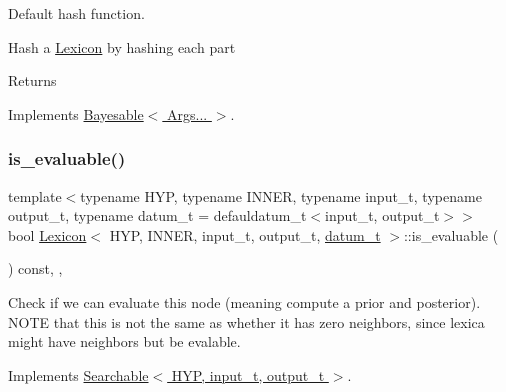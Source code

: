 Default hash function. 

Hash a \hyperlink{class_lexicon}{Lexicon} by hashing each part \begin{DoxyReturn}{Returns}

\end{DoxyReturn}


Implements \hyperlink{class_bayesable_a26f6d55e7526ebd897cbb27c757b611b}{Bayesable$<$ Args... $>$}.

\mbox{\label{class_lexicon_ab9fcefbd8598a5401a39bd59e8043db9}} 
\subsubsection{\texorpdfstring{is\+\_\+evaluable()}{is\_evaluable()}}
{\footnotesize\ttfamily template$<$typename H\+YP, typename I\+N\+N\+ER, typename input\+\_\+t, typename output\+\_\+t, typename datum\+\_\+t = defauldatum\+\_\+t$<$input\+\_\+t, output\+\_\+t$>$$>$ \\
bool \hyperlink{class_lexicon}{Lexicon}$<$ H\+YP, I\+N\+N\+ER, input\+\_\+t, output\+\_\+t, \hyperlink{class_bayesable_a9f1a6c0cd7855550fa10b1a8f13a5867}{datum\+\_\+t} $>$\+::is\+\_\+evaluable (\begin{DoxyParamCaption}{ }\end{DoxyParamCaption}) const\hspace{0.3cm}{\ttfamily [inline]}, {\ttfamily [override]}, {\ttfamily [virtual]}}



Check if we can evaluate this node (meaning compute a prior and posterior). N\+O\+TE that this is not the same as whether it has zero neighbors, since lexica might have neighbors but be evalable. 



Implements \hyperlink{class_searchable_a23786e95730117c3cc4b90e010494a1e}{Searchable$<$ H\+Y\+P, input\+\_\+t, output\+\_\+t $>$}.

\mbox{\label{class_lexicon_ad237c78e3435223f344d153da3baba9b}} 
